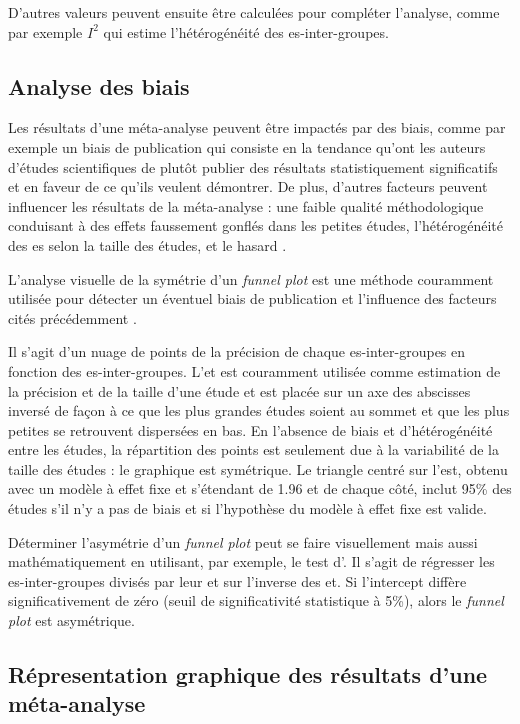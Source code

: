 D'autres valeurs peuvent ensuite être calculées pour compléter l'analyse, comme par exemple $I^2$ qui estime l'hétérogénéité des \gls{es}-inter-groupes. 

\subsection{Analyse des biais}

Les résultats d'une méta-analyse peuvent être impactés par des biais, comme par exemple un biais de publication qui consiste en la tendance qu'ont les auteurs 
d'études scientifiques de plutôt publier des résultats statistiquement significatifs et en faveur de ce qu'ils veulent démontrer. De plus,
d'autres facteurs peuvent influencer les résultats de la méta-analyse : une faible qualité méthodologique conduisant à des effets faussement gonflés
dans les petites études, l'hétérogénéité des \gls{es} selon la taille des études, et le hasard \citep{Sterne2011}.

L'analyse visuelle de la symétrie d'un \textit{funnel plot} est une méthode couramment utilisée pour détecter un éventuel biais de publication et 
l'influence des facteurs cités précédemment \citep{Sterne2011}.

Il s'agit d'un nuage de points de la précision de chaque \gls{es}-inter-groupes en fonction des \gls{es}-inter-groupes. L'\gls{et} est couramment 
utilisée comme estimation de la précision et de la taille d'une étude et est placée sur un axe des abscisses inversé de façon à ce que les plus grandes études 
soient au sommet et que les plus petites se retrouvent 
dispersées en bas. En l'absence de biais et d'hétérogénéité entre les études, la répartition des points est seulement due à la variabilité de la taille des études : 
le graphique est symétrique. Le triangle centré sur l'\gls{est}, obtenu avec un modèle à effet fixe et s'étendant de 1.96 \gls{et} de chaque côté, 
inclut 95\% des études s'il n'y a pas de biais et si l'hypothèse du modèle à effet fixe est valide.

Déterminer l'asymétrie d'un \textit{funnel plot} peut se faire visuellement mais aussi mathématiquement en utilisant, par exemple, le test d'\citet{Egger1997}. 
Il s'agit de régresser les \gls{es}-inter-groupes divisés par leur \gls{et} sur l'inverse des \gls{et}. Si l'intercept diffère significativement de 
zéro (seuil de significativité statistique à 5\%), alors le \textit{funnel plot} est asymétrique.

\subsection{Répresentation graphique des résultats d'une méta-analyse}

